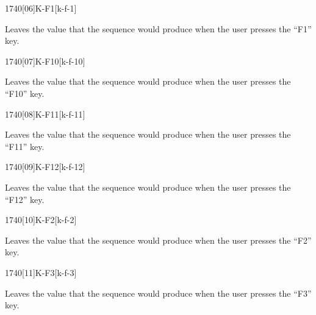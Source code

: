 \begin{worddef}{1740}[06]{K-F1}[k-f-1]%
\item {}

	Leaves the value  that the sequence 
	 would produce when the user presses the
	``F1'' key.

\end{worddef}


\begin{worddef}{1740}[07]{K-F10}[k-f-10]%
\item {}

	Leaves the value  that the sequence 
	 would produce when the user presses the
	``F10'' key.

\end{worddef}


\begin{worddef}{1740}[08]{K-F11}[k-f-11]%
\item {}

	Leaves the value  that the sequence 
	 would produce when the user presses the
	``F11'' key.

\end{worddef}


\begin{worddef}{1740}[09]{K-F12}[k-f-12]%
\item {}

	Leaves the value  that the sequence 
	 would produce when the user presses the
	``F12'' key.

\end{worddef}


\begin{worddef}{1740}[10]{K-F2}[k-f-2]%
\item {}

	Leaves the value  that the sequence 
	 would produce when the user presses the
	``F2'' key.

\end{worddef}


\begin{worddef}{1740}[11]{K-F3}[k-f-3]%
\item {}

	Leaves the value  that the sequence 
	 would produce when the user presses the
	``F3'' key.

\end{worddef}


